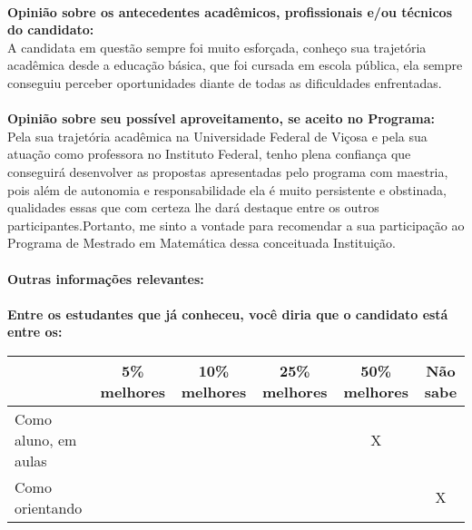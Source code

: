 \documentclass[11pt]{article}
\begin{document}
\\
\textbf{Opinião sobre os antecedentes acadêmicos, profissionais e/ou técnicos do candidato:}
\\A candidata em questão sempre foi muito esforçada, conheço sua trajetória acadêmica desde a educação básica, que foi cursada em escola pública, ela sempre conseguiu perceber oportunidades diante de todas as dificuldades enfrentadas.\\
\\
\textbf{Opinião sobre seu possível aproveitamento, se aceito no Programa:}
\\Pela sua trajetória acadêmica na Universidade Federal de Viçosa e pela sua atuação como professora no Instituto Federal, tenho plena confiança que conseguirá desenvolver as propostas apresentadas pelo programa com maestria, pois além de autonomia e responsabilidade ela é muito persistente e obstinada, qualidades essas que com certeza lhe dará destaque entre os outros participantes.Portanto, me sinto a vontade para recomendar a sua participação ao Programa de Mestrado em Matemática dessa conceituada Instituição.\\ 
\\
\textbf{Outras informações relevantes:} \\
\\[0.3cm]
\textbf{Entre os estudantes que já conheceu, você diria que o candidato está entre os:}
\\
\begin{tabular}{|l|c|c|c|c|c|}
\hline
 & 5\% melhores & 10\% melhores & 25\% melhores & 50\% melhores & Não sabe \\
\hline
Como aluno, em aulas &  &  &  & X & \\
\hline
Como orientando &  &  &  &  & X\\
\hline
\end{tabular}
\end{document}
